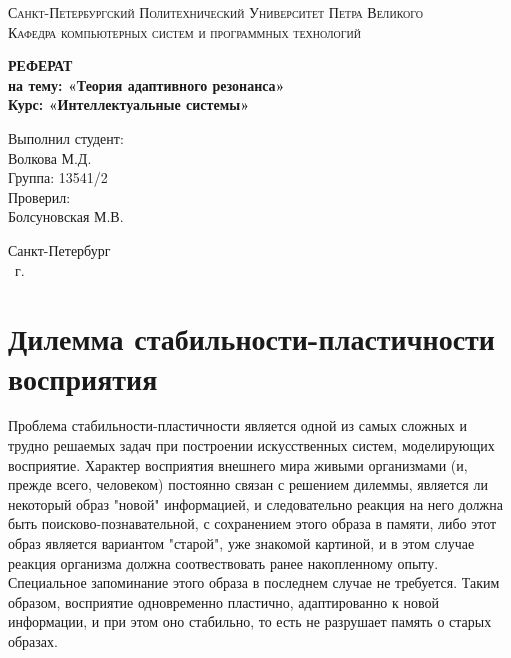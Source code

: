 \documentclass[12pt,a4paper,article]{article}
\begin{document}
\def\contentsname{Содержание}

\begin{titlepage}
	\begin{center}
		\textsc{Санкт-Петербургский Политехнический 
			Университет Петра Великого\\[5mm]
			Кафедра компьютерных систем и программных технологий}
		
		\vfill
		
		\textbf{РЕФЕРАТ\\
		на тему: «Теория адаптивного резонанса»\\[3mm]
			Курс: «Интеллектуальные системы»\\[41mm]
		}
	\end{center}
	
	\hfill
	\begin{minipage}{.4\textwidth}
		Выполнил студент:\\[2mm] 
		Волкова М.Д.\\
		Группа: 13541/2\\[5mm]
		
		Проверил:\\[2mm] 
		Болсуновская М.В.
	\end{minipage}
	\vfill
	\begin{center}
		Санкт-Петербург\\ \the\year\ г.
	\end{center}
\end{titlepage}

\tableofcontents
\clearpage



\section{Дилемма стабильности-пластичности восприятия}

Проблема стабильности-пластичности является одной из самых сложных и трудно решаемых задач при построении искусственных систем, моделирующих восприятие. Характер восприятия внешнего мира живыми организмами (и, прежде всего, человеком) постоянно связан с решением дилеммы, является ли некоторый образ "новой" информацией, и следовательно реакция на него должна быть поисково-познавательной, с сохранением этого образа в памяти, либо этот образ является вариантом "старой", уже знакомой картиной, и в этом случае реакция организма должна соотвествовать ранее накопленному опыту. Специальное запоминание этого образа в последнем случае не требуется. Таким образом, восприятие одновременно пластично, адаптированно к новой информации, и при этом оно стабильно, то есть не разрушает память о старых образах.
\end{document}
